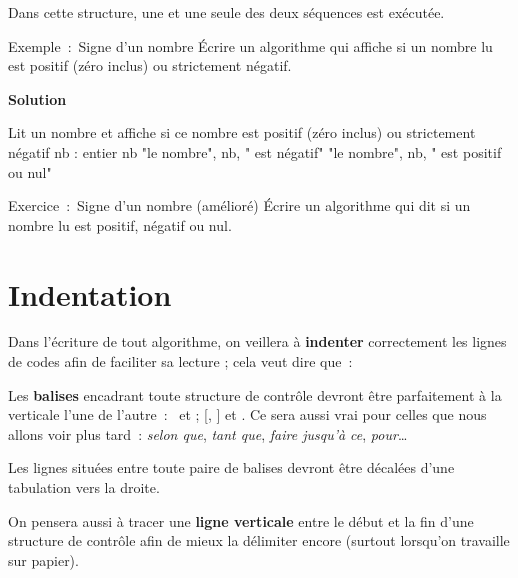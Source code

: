 	Dans cette structure, une et une seule des deux séquences est exécutée.
	
	\begin{Emphase}[exercice]{Exemple~:~Signe d’un nombre}
		Écrire un algorithme qui affiche si un nombre lu est positif 
		(zéro inclus) ou strictement négatif.
		
		{\bfseries Solution}
		
		\begin{Pseudocode}
		\LComment Lit un nombre et affiche si ce nombre est positif (zéro inclus)
		ou strictement négatif
			\Decl nb : entier
			\Read nb
				\Write "le nombre", nb, " est négatif"
			\Else
				\Write "le nombre", nb, " est positif ou nul"
			\EndIf
		\EndModule
		\end{Pseudocode}
	\end{Emphase}
	
	
	\begin{Emphase}[exercice]{Exercice~:~Signe d’un nombre (amélioré)}
		Écrire un algorithme qui dit si un nombre lu est positif, 
		négatif ou nul.
	\end{Emphase}
	
\section{Indentation}
	
	Dans l’écriture de tout algorithme, on veillera à \textbf{indenter}
	correctement les lignes de codes afin de faciliter sa lecture ; cela
	veut dire que~:
	
	\begin{liste}
	\item
		Les \textbf{balises} encadrant toute structure de contrôle 
		devront être parfaitement à la verticale l’une de l’autre~:~
		 et  ; 
		 [, ] 
		et .
		Ce sera aussi vrai pour celles que nous allons voir plus tard~: 
		\emph{selon que}, \emph{tant que}, \emph{faire jusqu’à ce},
		\emph{pour}\dots	
	\item
		Les lignes situées entre toute paire de balises 
		devront être décalées d’une tabulation vers la droite.
	\item
		On pensera aussi à tracer une \textbf{ligne verticale} 
		entre le début et la fin d’une structure de contrôle 
		afin de mieux la délimiter encore 
		(surtout lorsqu’on travaille sur papier).
	\end{liste}
	
